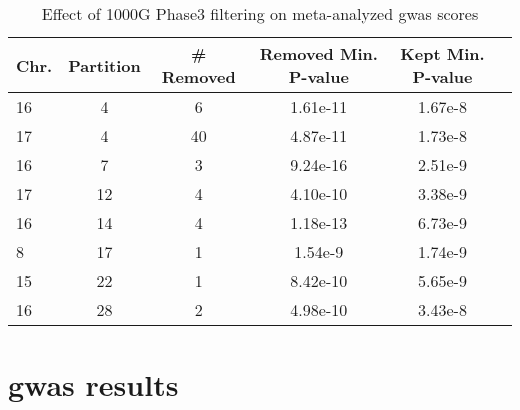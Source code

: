 \begin{table}[H]
{\scriptsize
\begin{tabular}{lccccc}\toprule
	\textbf{Chr.} &\textbf{Partition} &\textbf{\# Removed} &\textbf{Removed Min. P-value} &\textbf{Kept Min. P-value} \\\midrule
	16 &4 &6 &1.61e-11 &1.67e-8 \\
	17 &4 &40 &4.87e-11 &1.73e-8 \\
	16 &7 &3 &9.24e-16 &2.51e-9 \\
	17 &12 &4 &4.10e-10 &3.38e-9 \\
	16 &14 &4 &1.18e-13 &6.73e-9 \\
	8 &17 &1 &1.54e-9 &1.74e-9 \\
	15 &22 &1 &8.42e-10 &5.65e-9 \\
	16 &28 &2 &4.98e-10 &3.43e-8 \\
	\bottomrule
\end{tabular}
\label{tab:1000g_lost_bonf_chr}
}
\caption{Effect of 1000G Phase3 filtering on meta-analyzed \ac{gwas} scores} 

\end{table}

\chapter{\Acs{gwas} results}


